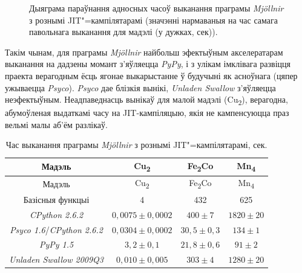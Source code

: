 \documentclass[a4paper,12pt]{article}
\newcommand{\progname}{\textit} %
\begin{document}
\begin{figure}[ht]
\caption{Дыяграма параўнання адносных часоў выканання праграмы \progname{Mj{\"o}llnir} з рознымі JIT"=кампілятарамі (значэнні нармаваныя на час самага павольнага выканання для мадэлі (у дужках, сек)).}
\label{pic:benchmark}
\end{figure}

Такім чынам, для праграмы \progname{Mj{\"o}llnir} найбольш эфектыўным акселератарам выканання на дадзены момант з'яўляецца \progname{PyPy}, і з улікам імклівага развіцця праекта верагодным ёсць ягонае выкарыстанне ў будучыні як асноўнага (цяпер ужываецца \progname{Psyco}). \progname{Psyco} дае блізкія вынікі, \progname{Unladen Swallow} з'яўляецца неэфектыўным. Неадпаведнасць вынікаў для малой мадэлі (Cu\textsubscript{2}), верагодна, абумоўленая выдаткамі часу на JIT-кампіляцыю, якія не кампенсуюцца праз вельмі малы аб'ём разлікаў.

\begin{longtable}{|>{}c|c|c|c|}
\caption{Час выканання праграмы \progname{Mj{\"o}llnir} з рознымі JIT"=кампілятарамі, сек.}\label{tab:benchmark}\\
\hline
Мадэль&Cu\textsubscript{2}&Fe\textsubscript{2}Co&Mn\textsubscript{4}\\
\hline\endfirsthead
\hline
Мадэль&Cu\textsubscript{2}&Fe\textsubscript{2}Co&Mn\textsubscript{4}\\
\hline\endhead
Базісныя функцыі&4&432&625\\
\hline
\progname{CPython 2.6.2}&$0,0075 \pm 0,0002$&$400 \pm 7$&$1820 \pm 20$\\
\hline
\progname{Psyco 1.6}/\progname{CPython 2.6.2}&$0,0304 \pm 0,0002$&$30,5 \pm 0,3$&$134 \pm 1$\\
\hline
\progname{PyPy 1.5} &$3,2 \pm 0,1$&$21,8 \pm 0,6$&$91 \pm 2$\\
\hline
\progname{Unladen Swallow 2009Q3}&$0,010 \pm 0,005$&$303 \pm 4$&$1280 \pm 20$\\
\hline
\end{longtable}
\end{document}
